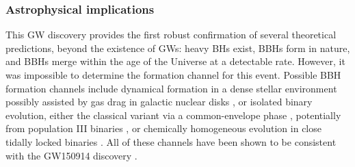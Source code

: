 \documentclass[binding=0.6cm, LaM]{sapthesis}
\begin{document}
	\subsubsection{Astrophysical implications}
	This GW discovery provides the first robust confirmation of several theoretical predictions, beyond the existence of GWs:
	heavy BHs exist, BBHs form in nature, and BBHs merge within the age of the Universe at a detectable rate. 
	However, it was impossible to determine the formation channel for this event. 
	Possible BBH formation channels include dynamical formation in a dense stellar environment \cite{84, 88} 
	possibly assisted by gas drag in galactic nuclear disks \cite{82, 83}, or isolated binary evolution, 
	either the classical variant via a common-envelope phase \cite{76-81}, 
	potentially from population III binaries \cite{74, 75}, or chemically homogeneous evolution 
	in close tidally locked binaries \cite{72, 73}. 
	All of these channels have been shown to be consistent with the GW150914 discovery \cite{63-70}. 
\end{document}
